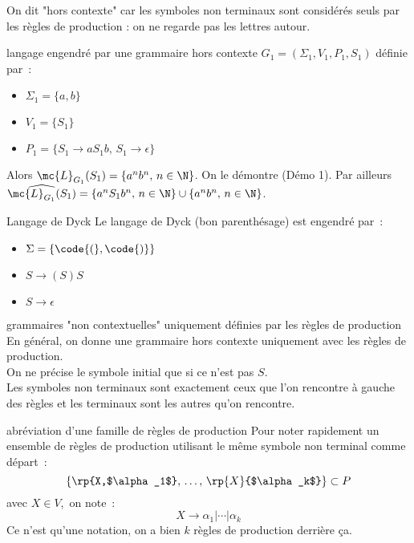 \begin{adjustwidth}{-3cm}{-3cm}
\begin{remarque}{}{}
    On dit "hors contexte" car les symboles non terminaux sont considérés seuls par les règles de production : on ne regarde pas les lettres autour.
\end{remarque}

\newcommand{\leng}[2]{\mc{L}_{#1}(#2)}


\begin{exemple}{}{langage engendré par une grammaire hors contexte}
    $G_1 = (\Sigma_1, V_1, P_1, S_1)$ définie par~:
    \begin{itemize}
        \item $\Sigma_1 = \{a,b\}$
        \item $V_1 = \{S_1\}$
        \item $P_1 = \{S_1 \rightarrow a S_1 b,\,S_1\rightarrow \epsilon\}$
    \end{itemize}
    Alors $\mc{L}_{G_1}(S_1) = \{a^nb^n,\, n \in \N\}$. On le démontre (Démo 1).
    Par ailleurs $\widehat{\mc{L}_{G_1}(S_1)} = \{a^n S_1 b^n,\, n \in \N\} \cup \{a^n b^n ,\, n \in \N\}$.
\end{exemple}

\begin{exemple}{}{Langage de Dyck}
    Le langage de Dyck (bon parenthésage) est engendré par~:
    \begin{itemize}
        \item $\Sigma = \{\code{(}, \code{)}\}$
        \item $S \rightarrow {(S)S}$
        \item $S \rightarrow \epsilon$
    \end{itemize}
\end{exemple}

\begin{remarque}{}{grammaires "non contextuelles" uniquement définies par les règles de production}
    En général, on donne une grammaire hors contexte uniquement avec les règles de production.\\
    On ne précise le symbole initial que si ce n'est pas $S$.\\
    Les symboles non terminaux sont exactement ceux que l'on rencontre à gauche des règles et les terminaux sont les autres qu'on rencontre.
\end{remarque}

\begin{remarque}{}{abréviation d'une famille de règles de production}
    Pour noter rapidement un ensemble de règles de production utilisant le même symbole non terminal comme départ~:
    $$\{\rp{X,$\alpha_1$},\, \dots,\, \rp{X}{$\alpha_k$}\} \subset P$$
    avec $X\in V$,\, on note~:
    $$X \rightarrow \alpha_1 \vert \cdots \vert \alpha_k$$
    Ce n'est qu'une notation, on a bien $k$ règles de production derrière ça.
\end{remarque}


\end{adjustwidth}
